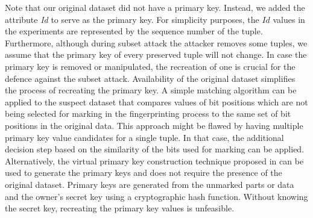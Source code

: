 Note that our original dataset did not have a primary key. 
Instead, we added the attribute \textit{Id} to serve as the primary key. 
For simplicity purposes, the $Id$ values in the experiments are represented by the sequence number of the tuple.
Furthermore, although during subset attack the attacker removes some tuples, we assume that the primary key of every preserved tuple will not change.
In case the primary key is removed or manipulated, the recreation of one is crucial for the defence against the subset attack.
Availability of the original dataset simplifies the process of recreating the primary key. 
A simple matching algorithm can be applied to the suspect dataset that compares values of bit positions which are not being selected for marking in the fingerprinting process to the same set of bit positions in the original data. 
This approach might be flawed by having multiple primary key value candidates for a single tuple. 
In that case, the additional decision step based on the similarity of the bits used for marking can be applied.
Alternatively, the virtual primary key construction technique proposed in \cite{li2003constructing} can be used to generate the primary keys and does not require the presence of the original dataset. 
Primary keys are generated from the unmarked parts or data and the owner's secret key using a cryptographic hash function. Without knowing the secret key, recreating the primary key values is unfeasible. 

